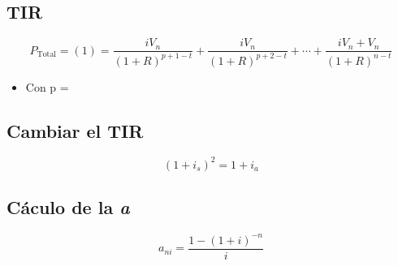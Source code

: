 \documentclass[11pt, a4paper]{article}
\begin{document}

\subsection{TIR}
\begin{tcolorbox}[colframe=blue!50, colback=blue!5, sharp corners] %
\begin{equation}
    P_{\text{Total}} = (1) = \frac{iV_n}{(1+R)^{p+1-t}} + \frac{iV_n}{(1+R)^{p+2-t}} + \cdots + \frac{iV_n+V_n}{(1+R)^{n-t}}
\end{equation}
\end{tcolorbox}

\begin{itemize}
    \item Con p = 
\end{itemize}


\subsection{Cambiar el TIR}
\begin{tcolorbox}[colframe=blue!50, colback=blue!5, sharp corners] %
\begin{equation}
    (1+i_s)^2=1+i_a
\end{equation}
\end{tcolorbox}

\subsection{Cáculo de la \textit{a}}
\begin{tcolorbox}[colframe=blue!50, colback=blue!5, sharp corners] %
\begin{equation}
    a_{ni}=\frac{1-(1+i)^{-n}}{i}
\end{equation}
\end{tcolorbox}
\end{document}
